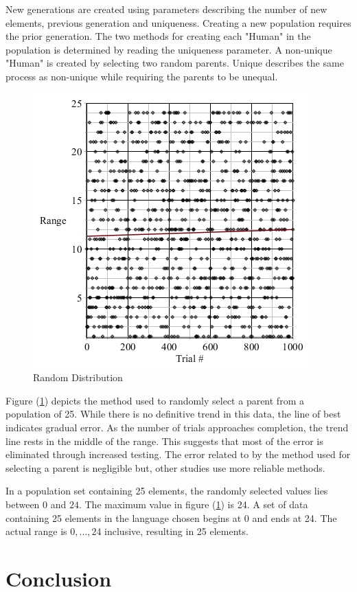 \documentclass[12pt]{extarticle}
\begin{document}
New generations are created using parameters describing the number of new elements, previous generation and uniqueness. Creating a new population requires the prior generation. The two methods for creating each "Human" in the population is determined by reading the uniqueness parameter. A non-unique "Human" is created by selecting two random parents. Unique describes the same process as non-unique while requiring the parents to be unequal.
\begin{figure}[h!]
	\centering
	\includegraphics[scale=0.70]{RandomProof.png}
	\caption{Random Distribution}
	\label{fig:img8}
\end{figure}

Figure (\ref{fig:img8}) depicts the method used to randomly select a parent from a population of 25. While there is no definitive trend in this data, the line of best indicates gradual error. As the number of trials approaches completion, the trend line rests in the middle of the range. This suggests that most of the error is eliminated through increased testing. The error related to by the method used for selecting a parent is negligible but, other studies use more reliable methods. 

In a population set containing 25 elements, the randomly selected values lies between $0$ and $24$. The maximum value in figure (\ref{fig:img8}) is 24. A set of data containing 25 elements in the language chosen begins at 0 and ends at 24. The actual range is $0, ..., 24$ inclusive, resulting in 25 elements.

\section{Conclusion}
\end{document}
